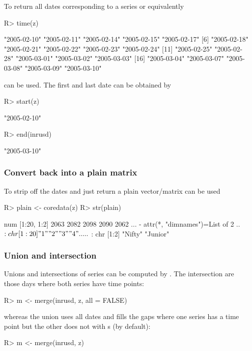 \documentclass{Z}
\newcommand{\mysection}[1]{\subsubsection[#1]{\textbf{#1}}}
\begin{document}
To return all dates corresponding to a series
 or equivalently 
\begin{Schunk}
\begin{Sinput}
R> time(z)
\end{Sinput}
\begin{Soutput}
 [1] "2005-02-10" "2005-02-11" "2005-02-14" "2005-02-15" "2005-02-17"
 [6] "2005-02-18" "2005-02-21" "2005-02-22" "2005-02-23" "2005-02-24"
[11] "2005-02-25" "2005-02-28" "2005-03-01" "2005-03-02" "2005-03-03"
[16] "2005-03-04" "2005-03-07" "2005-03-08" "2005-03-09" "2005-03-10"
\end{Soutput}
\end{Schunk}
can be used. The first and last date can be obtained by
\begin{Schunk}
\begin{Sinput}
R> start(z)
\end{Sinput}
\begin{Soutput}
[1] "2005-02-10"
\end{Soutput}
\begin{Sinput}
R> end(inrusd)
\end{Sinput}
\begin{Soutput}
[1] "2005-03-10"
\end{Soutput}
\end{Schunk}

\mysection{Convert back into a plain matrix}

To strip off the dates and just return a plain vector/matrix
 can be used
\begin{Schunk}
\begin{Sinput}
R> plain <- coredata(z)
R> str(plain)
\end{Sinput}
\begin{Soutput}
 num [1:20, 1:2] 2063 2082 2098 2090 2062 ...
 - attr(*, "dimnames")=List of 2
  ..$ : chr [1:20] "1" "2" "3" "4" ...
  ..$ : chr [1:2] "Nifty" "Junior"
\end{Soutput}
\end{Schunk}

\mysection{Union and intersection}

Unions and intersections of series can be computed by . The
intersection are those days where both series have time points:
\begin{Schunk}
\begin{Sinput}
R> m <- merge(inrusd, z, all = FALSE)
\end{Sinput}
\end{Schunk}
whereas the union uses all dates and fills the gaps where one
series has a time point but the other does not 
with s (by default):
\begin{Schunk}
\begin{Sinput}
R> m <- merge(inrusd, z)
\end{Sinput}
\end{Schunk}
\end{document}
